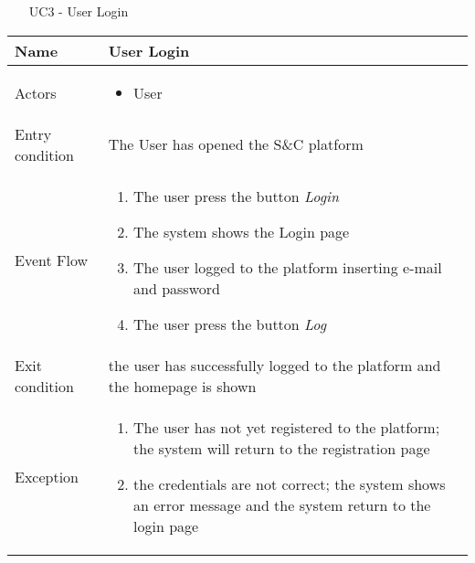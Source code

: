 			\begin{table} [H]
				\centering
					\begin{itemize}
					\item [UC3] - User Login
				\end{itemize}
				\begin{tabular}{|| P{7.5cm} | P{7.5cm} ||}
					\hline
					Name & User Login \\
					\hline
					Actors & \parbox{5cm}{\begin{itemize}
							\item User
						\end{itemize}
					} \\
					\hline
					Entry condition & The User has opened the S\&C platform \\
					\hline
					Event Flow & \parbox{5cm}{\begin{enumerate}
							\item The user press the button \textit{Login}
							\item The system shows the Login page
							\item The user logged to the platform 
							inserting e-mail and password 
							\item The user press the button \textit{Log}
					\end{enumerate}} \\
					\hline 
					Exit condition & the user has successfully logged to the 
					platform and the homepage is shown \\
					\hline
					Exception & \parbox{5cm}{\begin{enumerate}
							\item The user has not yet registered to the 
							platform; the system will return to the 
							registration page
							\item the credentials are not correct; the system shows an error message and the system return to the login page
							\end{enumerate}} \\
					\hline
				\end{tabular}
			\end{table}
			
		
			
